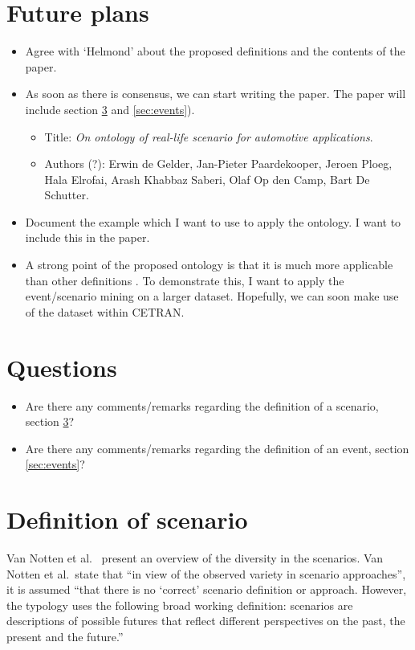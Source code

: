 \documentclass[10pt,final,a4paper,oneside,onecolumn]{article}
\begin{document}
\section{Future plans}

\begin{itemize}
	\item Agree with `Helmond' about the proposed definitions and the contents of the paper. 
	\item As soon as there is consensus, we can start writing the paper. The paper will include section \ref{sec:scenario definition} and \ref{sec:events}).
	\begin{itemize}
		\item Title: \emph{On ontology of real-life scenario for automotive applications}.
		\item Authors (?): Erwin de Gelder, Jan-Pieter Paardekooper, Jeroen Ploeg, Hala Elrofai, Arash Khabbaz Saberi, Olaf Op den Camp, Bart De Schutter.
	\end{itemize}
	\item Document the example which I want to use to apply the ontology. I want to include this in the paper.
	\item A strong point of the proposed ontology is that it is much more applicable than other definitions \cite{geyer2014, ulbrich2015, elrofai2016scenario}. To demonstrate this, I want to apply the event/scenario mining on a larger dataset. Hopefully, we can soon make use of the dataset within CETRAN.
\end{itemize}

\section{Questions}

\begin{itemize}
	\item Are there any comments/remarks regarding the definition of a scenario, section \ref{sec:scenario definition}?
	\item Are there any comments/remarks regarding the definition of an event, section \ref{sec:events}?
\end{itemize}

\section{Definition of scenario}

\label{sec:scenario definition}
Van Notten et al.\ \cite{vannotten2003updated} present an overview of the diversity in the scenarios. Van Notten et al.\ state that ``in view of the observed variety in scenario approaches'', it is assumed ``that there is no `correct' scenario definition or approach. However, the typology uses the following broad working definition: scenarios are descriptions of possible futures that reflect different perspectives on the past, the present and the future.''
\end{document}
